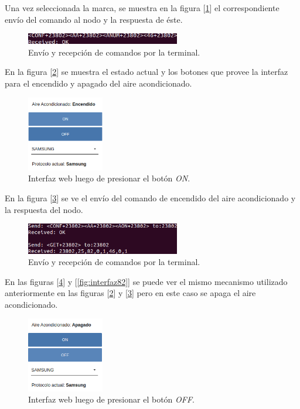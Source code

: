 Una vez seleccionada la marca, se muestra en la figura [\ref{fig:interfaz70}] el correspondiente envío del comando al nodo y la respuesta de éste.

\begin{figure}[h!]
	\centering
	\includegraphics[width=0.6\textwidth]{./Figures/interfaz70.png}
	\caption{Envío y recepción de comandos por la terminal.}
	\label{fig:interfaz70}
\end{figure}

En la figura [\ref{fig:interfaz72}] se muestra el estado actual y los botones que provee la interfaz para el encendido y apagado del aire acondicionado.

\begin{figure}[h!]
	\centering
	\includegraphics[width=0.3\textwidth]{./Figures/interfaz72.png}
	\caption{Interfaz web luego de presionar el botón {\textit{ON}}.}
	\label{fig:interfaz72}
\end{figure}

En la figura [\ref{fig:interfaz73}] se ve el envío del comando de encendido del aire acondicionado y la respuesta del nodo.

\begin{figure}[h!]
	\centering
	\includegraphics[width=0.6\textwidth]{./Figures/interfaz73.png}
	\caption{Envío y recepción de comandos por la terminal.}
	\label{fig:interfaz73}
\end{figure}

En las figuras [\ref{fig:interfaz81}] y [\ref{fig:interfaz82}] se puede ver el mismo mecanismo utilizado anteriormente en las figuras [\ref{fig:interfaz72}] y [\ref{fig:interfaz73}] pero en este caso se apaga el aire acondicionado.

\begin{figure}[ht!]
	\centering
	\includegraphics[width=0.3\textwidth]{./Figures/interfaz81.png}
	\caption{Interfaz web luego de presionar el botón {\textit{OFF}}.}
	\label{fig:interfaz81}
\end{figure}

